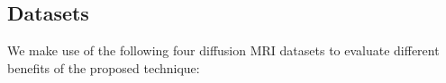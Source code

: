 

\subsection{Datasets} \label{sec:dataset}
We make use of the following four diffusion MRI datasets to evaluate different benefits of the proposed technique: 

